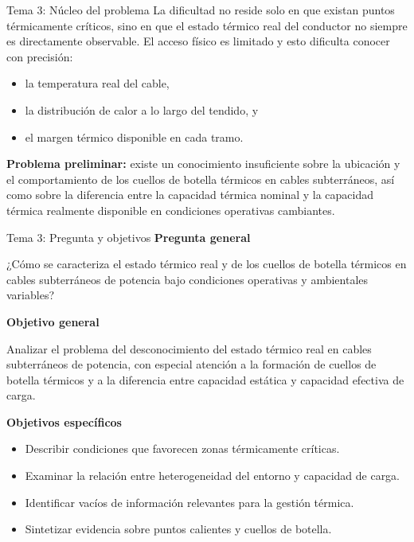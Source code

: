\documentclass[aspectratio=169]{beamer}
\begin{document}
\begin{frame}{Tema 3: Núcleo del problema}
\justifying
La dificultad no reside solo en que existan puntos térmicamente críticos, sino en que el estado térmico real del conductor no siempre es directamente observable. El acceso físico es limitado y esto dificulta conocer con precisión:
\begin{itemize}[leftmargin=*]
    \item la temperatura real del cable,
    \item la distribución de calor a lo largo del tendido, y
    \item el margen térmico disponible en cada tramo.
\end{itemize}

\vspace{0.5em}
\textbf{Problema preliminar:} existe un conocimiento insuficiente sobre la ubicación y el comportamiento de los cuellos de botella térmicos en cables subterráneos, así como sobre la diferencia entre la capacidad térmica nominal y la capacidad térmica realmente disponible en condiciones operativas cambiantes.
\end{frame}

\begin{frame}{Tema 3: Pregunta y objetivos}
\textbf{Pregunta general}

¿Cómo se caracteriza el estado térmico real y de los cuellos de botella térmicos en cables subterráneos de potencia bajo condiciones operativas y ambientales variables?

\vspace{0.7em}
\textbf{Objetivo general}

Analizar el problema del desconocimiento del estado térmico real en cables subterráneos de potencia, con especial atención a la formación de cuellos de botella térmicos y a la diferencia entre capacidad estática y capacidad efectiva de carga.

\vspace{0.7em}
\textbf{Objetivos específicos}
\begin{itemize}[leftmargin=*]
    \item Describir condiciones que favorecen zonas térmicamente críticas.
    \item Examinar la relación entre heterogeneidad del entorno y capacidad de carga.
    \item Identificar vacíos de información relevantes para la gestión térmica.
    \item Sintetizar evidencia sobre puntos calientes y cuellos de botella.
\end{itemize}
\end{frame}
\end{document}
